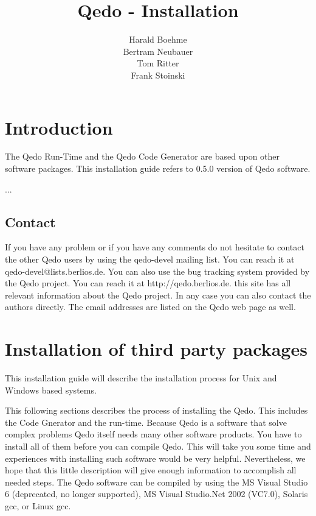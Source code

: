 \documentclass[12pt,a4paper]{report}
\begin{document}
\title{Qedo - Installation}
\author{Harald Boehme \\ Bertram Neubauer \\ Tom Ritter \\ Frank Stoinski}

\maketitle

\setcounter{page}{1} 

\tableofcontents


\chapter{Introduction}
\label{sec:Introduction}

The Qedo Run-Time and the Qedo Code Generator are based upon other software packages. 
This installation guide refers to {0.5.0} version of Qedo software.

...

\section{Contact}
\label{sec:Contact}

If you have any problem or if you have any comments do not hesitate to contact the other Qedo users by using the qedo-devel mailing list. You can reach it at qedo-devel@lists.berlios.de. You can also use the bug tracking system provided by the Qedo project. You can reach it at http://qedo.berlios.de. this site has all relevant information about the Qedo project. In any case you can also contact the authors directly. The email addresses are listed on the Qedo web page as well.


\chapter{Installation of third party packages}
\label{sec:Installation}

This installation guide will describe the installation process for Unix and Windows based systems.

This following sections describes the process of installing the Qedo. This includes the Code Gnerator and the run-time. Because Qedo is a software that solve complex problems Qedo itself needs many other software products. You have to install all of them before you can compile Qedo. This will take you some time and experiences with installing such software would be very helpful. Nevertheless, we hope that this little description will give enough information to accomplish all needed steps. 
The Qedo software can be compiled by using the MS Visual Studio 6 (deprecated, no longer supported), MS Visual Studio.Net 2002 (VC7.0), Solaris gcc, or Linux gcc.
\end{document}
